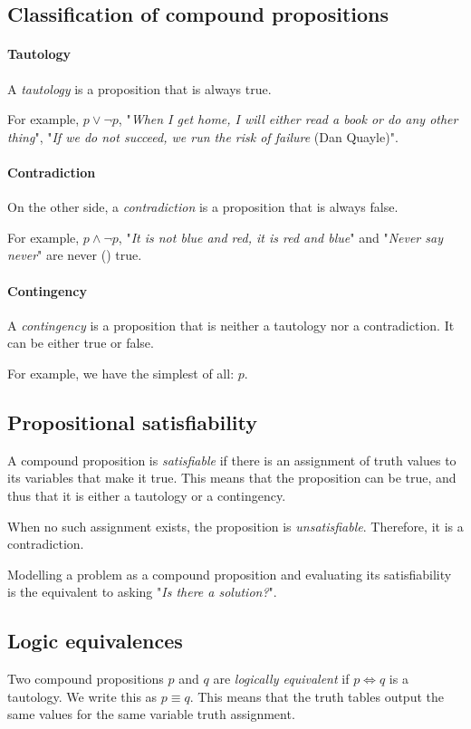 \documentclass[10pt,a4paper]{book}
\begin{document}
\subsection{Classification of compound propositions}
\paragraph*{Tautology} A \textit{tautology} is a proposition that is always true.\par 
For example, $p\lor \neg p$, "\textit{When I get home, I will either read a book or do any other thing}", "\textit{If we do not succeed, we run the risk of failure} (Dan Quayle)".
\paragraph*{Contradiction} On the other side, a \textit{contradiction} is a proposition that is always false.\par 
For example, $p\land \neg p$, "\textit{It is not blue and red, it is red and blue}" and "\textit{Never say never}" are never (\smiley{}) true.
\paragraph*{Contingency} A \textit{contingency} is a proposition that is neither a tautology nor a contradiction. It can be either true or false.\par 
For example, we have the simplest of all: $p$.

\subsection{Propositional satisfiability}
A compound proposition is \textit{satisfiable} if there is an assignment of truth values to its variables that make it true. This means that the proposition can be true, and thus that it is either a tautology or a contingency.\par 
When no such assignment exists, the proposition is \textit{unsatisfiable}. Therefore, it is a contradiction.\par 
Modelling a problem as a compound proposition and evaluating its satisfiability is the equivalent to asking "\textit{Is there a solution?}".

\subsection{Logic equivalences}
Two compound propositions $p$ and $q$ are \textit{logically equivalent} if $p\Leftrightarrow q$ is a tautology. We write this as $p\equiv q$. This means that the truth tables output the same values for the same variable truth assignment. 
\end{document}
